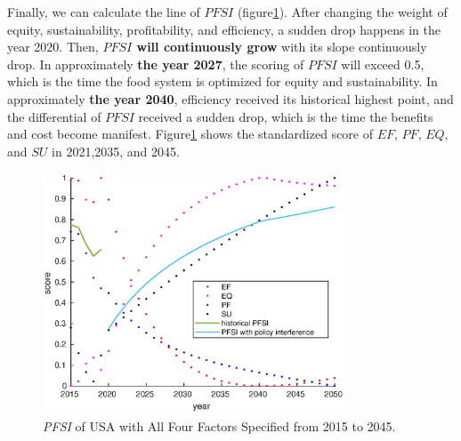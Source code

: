 \documentclass[12pt]{article}
\begin{document}
Finally, we can calculate the line of $PFSI$ (figure\ref{fig:USA_score}). After changing the weight of equity, sustainability, profitability, and efficiency, a sudden drop happens in the year 2020. Then, \textbf{$PFSI$ will continuously grow} with its slope continuously drop. In approximately \textbf{the year 2027}, the scoring of $PFSI$ will exceed 0.5, which is the time the food system is optimized for equity and sustainability. In approximately \textbf{the year 2040},
efficiency received its historical highest point, and the differential of $PFSI$ received a sudden drop, which is the time the benefits and cost become manifest. Figure\ref{fig:USA_score} shows the standardized score of $EF$, $PF$, $EQ$, and $SU$ in 2021,2035, and 2045.


\begin{figure}[!htb]
    \centering
    \begin{minipage}[t]{0.48\textwidth}
        \centering
        \includegraphics[width = 0.8\textwidth]{figure/model/USA/USA_score.eps}
        \caption{\textit{PFSI} of USA with All Four Factors Specified from 2015 to 2045.\label{fig:USA_score}}
    \end{minipage}
    \begin{minipage}[t]{0.48\textwidth}
        \centering

\end{minipage}
\end{figure}
\end{document}
